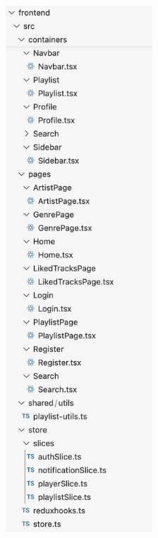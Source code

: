 \documentclass[a4paper]{article}
\begin{document}
\begin{figure}[h!]
\begin{center}
\includegraphics[width=5.5cm]{frontend_folder_2.png}
\end{center}
\end{figure}
\end{document}
